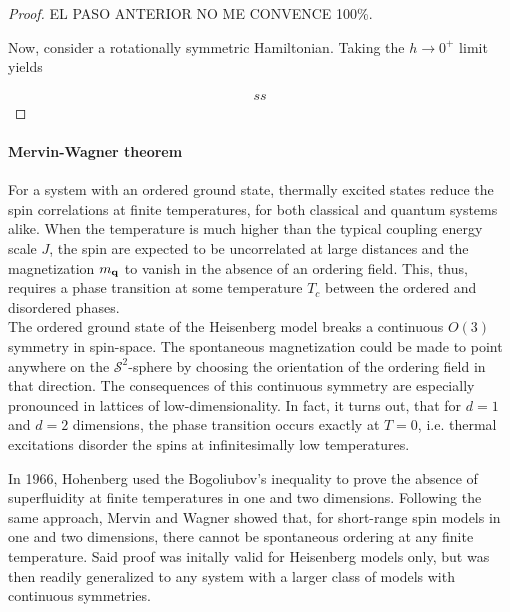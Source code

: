 \documentclass{homework}
\begin{document}
\begin{proof}
EL PASO ANTERIOR NO ME CONVENCE 100\%.

Now, consider a rotationally symmetric Hamiltonian. Taking the $h\rightarrow0^+$ limit yields

\begin{equation}
    \begin{split}
        ss
    \end{split}
\end{equation}

\end{proof}

\paragraph{Mervin-Wagner theorem}

For a system with an ordered ground state, thermally excited states reduce the spin correlations at finite temperatures, for both classical and quantum systems alike. When the temperature is much higher than the typical coupling energy scale $J$, the spin are expected to be uncorrelated at large distances and the magnetization $m_{{\bf q}}$ to vanish in the absence of an ordering field. This, thus, requires a phase transition at some temperature $T_c$ between the ordered and disordered phases. \\

The ordered ground state of the Heisenberg model breaks a continuous $O(3)$ symmetry in spin-space. The spontaneous magnetization could be made to point anywhere on the $\mathcal{S}^2$-sphere by choosing the orientation of the ordering field in that direction. The consequences of this continuous symmetry are especially pronounced in lattices of low-dimensionality. In fact, it turns out, that for $d=1$ and $d=2$ dimensions, the phase transition occurs exactly at $T = 0$, i.e. thermal excitations disorder the spins at infinitesimally low temperatures. \\

\begin{tcolorbox}[colback=LimeGreen, 
title = Historical Note]

In 1966, Hohenberg used the Bogoliubov's inequality to prove the absence of superfluidity at finite temperatures in one and two dimensions. Following the same approach, Mervin and Wagner showed that, for short-range spin models in one and two dimensions, there cannot be spontaneous ordering at any finite temperature. Said proof was initally valid for Heisenberg models only, but was then readily generalized to any system with a larger class of models with continuous symmetries. 

\end{tcolorbox}
\end{document}
